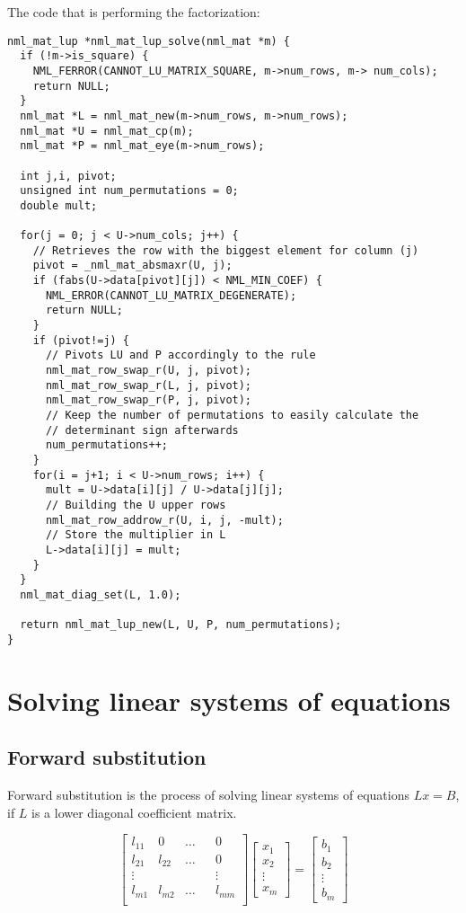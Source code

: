 The code that is performing the factorization:

\begin{verbatim}
nml_mat_lup *nml_mat_lup_solve(nml_mat *m) {
  if (!m->is_square) {
    NML_FERROR(CANNOT_LU_MATRIX_SQUARE, m->num_rows, m-> num_cols);
    return NULL;
  }
  nml_mat *L = nml_mat_new(m->num_rows, m->num_rows);
  nml_mat *U = nml_mat_cp(m);
  nml_mat *P = nml_mat_eye(m->num_rows);

  int j,i, pivot;
  unsigned int num_permutations = 0;
  double mult;

  for(j = 0; j < U->num_cols; j++) {
    // Retrieves the row with the biggest element for column (j)
    pivot = _nml_mat_absmaxr(U, j);
    if (fabs(U->data[pivot][j]) < NML_MIN_COEF) {
      NML_ERROR(CANNOT_LU_MATRIX_DEGENERATE);
      return NULL;
    }
    if (pivot!=j) {
      // Pivots LU and P accordingly to the rule
      nml_mat_row_swap_r(U, j, pivot);
      nml_mat_row_swap_r(L, j, pivot);
      nml_mat_row_swap_r(P, j, pivot);
      // Keep the number of permutations to easily calculate the
      // determinant sign afterwards
      num_permutations++;
    }
    for(i = j+1; i < U->num_rows; i++) {
      mult = U->data[i][j] / U->data[j][j];
      // Building the U upper rows
      nml_mat_row_addrow_r(U, i, j, -mult);
      // Store the multiplier in L
      L->data[i][j] = mult;
    }
  }
  nml_mat_diag_set(L, 1.0);

  return nml_mat_lup_new(L, U, P, num_permutations);
} 
\end{verbatim}

\section{Solving linear systems of equations}

\subsection{Forward substitution}

Forward substitution is the process of solving linear systems of equations $Lx=B$, if $L$ is a lower diagonal coefficient matrix.

$$
\begin{bmatrix}
l_{11} & 0 & \ldots && 0\\
l_{21} & l_{22} & \ldots && 0\\
\vdots & & & & \vdots \\
l_{m1} & l_{m2} & \ldots && l_{mm}\\
\end{bmatrix}
\begin{bmatrix}
x_{1} \\
x_{2} \\
\vdots   \\
x_{m}
\end{bmatrix}
=
\begin{bmatrix}
b_{1} \\
b_{2} \\
\vdots \\
b_{m}
\end{bmatrix}
$$

